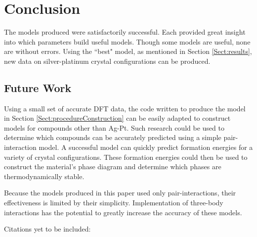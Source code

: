 \section{Conclusion}\label{Sect:conclusion}
\par The models produced were satisfactorily successful. Each provided great insight into which parameters build useful models. Though some models are useful, none are without errors. Using the ``best" model, as mentioned in Section \ref{Sect:results}, new data on silver-platinum crystal configurations can be produced.


\subsection{Future Work}\label{Sect:futureWork}
\par Using a small set of accurate DFT data, the code written to produce the model in Section \ref{Sect:procedureConstruction} can be easily adapted to construct models for compounds other than Ag-Pt. Such research could be used to determine which compounds can be accurately predicted using a simple pair-interaction model. A successful model can quickly predict formation energies for a variety of crystal configurations. These formation energies could then be used to construct the material’s phase diagram and determine which phases are thermodynamically stable.
\par Because the models produced in this paper used only pair-interactions, their effectiveness is limited by their simplicity. Implementation of three-body interactions has the potential to greatly increase the accuracy of these models.
\par Citations yet to be included: \cite{_AFLOW} \cite{Kohn1965} \cite{curt2005scienceandtech} \cite{curtarolo2003predicting} \cite{Kresse:1999wc} \cite{kresse1993abinitio} \cite{Blochl:1994dx} \cite{kresse1996efficiency} \cite{monkhorst1976special} \cite{sanchez1984generalized} \cite{laks1992efficient} \cite{lerch2009uncle} \cite{cockayne2010building} \cite{nelson2013compressive}